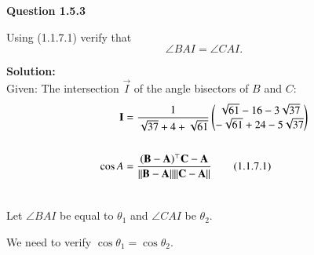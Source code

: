 \documentclass[journal,12pt,twocolumn]{IEEEtran}
\theoremstyle{remark}
\begin{document}
\textbf{Question 1.5.3}
\begin{flushleft}
Using (1.1.7.1) verify that 
	$${\angle BAI = \angle CAI.}$$ 

\end{flushleft}
\textbf{Solution:}\\ 

Given: The intersection $\vec{I}$ of the angle bisectors of $B$ and $C$:
\begin{align}
\mathbf{I} &= \frac{1}{\sqrt{37}+ 4 +\sqrt{61}}\begin{pmatrix}
{\sqrt{61}-16-3\sqrt{37}}\\
{-\sqrt{61}+24-5\sqrt{37}}
\end{pmatrix}\\[16pt]
\cos{A} &= \frac{(\mathbf{B} - \mathbf{A})^{\top}\mathbf{C} - \mathbf{A}}{||\mathbf{B} - \mathbf{A}|| || \mathbf{C} - \mathbf{A}||} \qquad(1.1.7.1)\\[16pt]
\end{align}

Let $\angle BAI$ be equal to $\theta_1$ and $\angle CAI$ be $\theta_2$.

We need to verify $\cos{\theta_1} = \cos{\theta_2}$.
\end{document}
